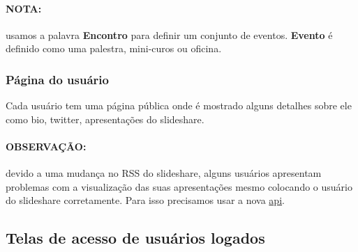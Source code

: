 \paragraph{NOTA:}

usamos a palavra \textbf{Encontro} para definir um conjunto de eventos.
\textbf{Evento} é definido como uma palestra, mini-curos ou oficina.

\subsubsection{Página do usuário \label{usuario}}

Cada usuário tem uma página pública onde é mostrado alguns detalhes
sobre ele como bio, twitter, apresentações do slideshare.

\paragraph{OBSERVAÇÃO:}

devido a uma mudança no RSS do slideshare, alguns usuários apresentam
problemas com a visualização das suas apresentações mesmo colocando o
usuário do slideshare corretamente. Para isso precisamos usar a nova
\href{http://apiexplorer.slideshare.net/}{api}.

\subsection{Telas de acesso de usuários logados}

